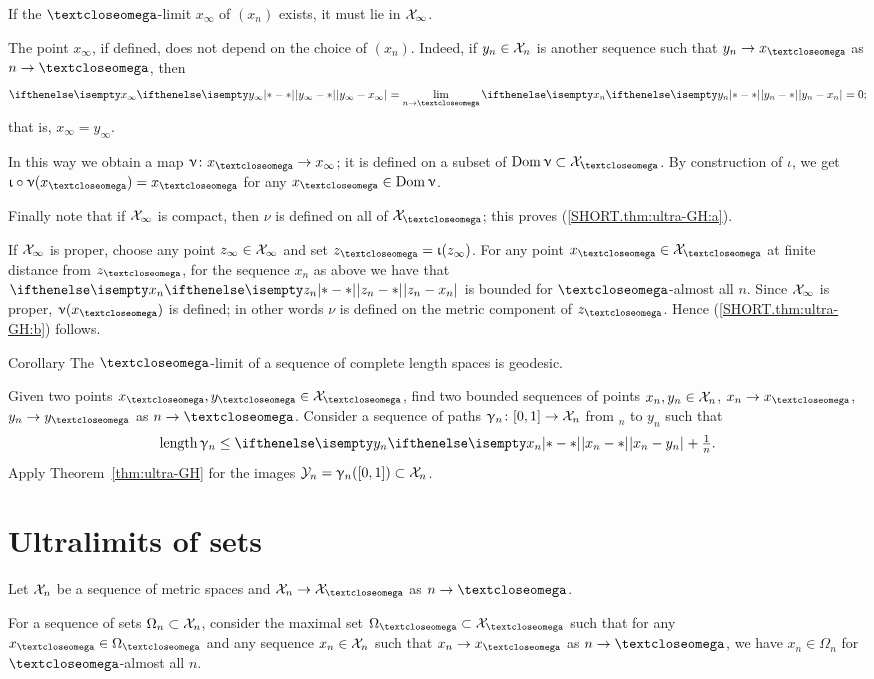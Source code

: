 If the $\o$-limit $x_\infty$ of $(x_n)$ exists, 
it must lie in $\mathcal{X}_\infty$. 

The point $x_\infty$, if defined, does not depend on the choice of $(x_n)$.
Indeed, if $y_n\in\spc{X}_n$ is another sequence such that $y_n\to x_\o$ as $n\to\o$, then 
\[
\dist{y_\infty}{x_\infty}{}=\lim_{n\to\o}\dist{y_n}{x_n}{}=0;
\]
that is, $x_\infty=y_\infty$.


In this way we obtain a map $\nu\:x_\o\to x_\infty$;
it is defined on a subset of $\Dom\nu \subset\spc{X}_\o$.
By construction of $\iota$, 
we get  $\iota\circ\nu(x_\o)=x_\o$ for any $x_\o\in \Dom\nu$.

Finally note that if $\mathcal{X}_\infty$ is compact, then $\nu$ is defined on all of $\spc{X}_\o$;
this proves (\ref{SHORT.thm:ultra-GH:a}).

If $\mathcal{X}_\infty$ is proper, choose any point $z_\infty\in \spc{X}_\infty$
and set $z_\o=\iota(z_\infty)$.
For any point $x_\o\in \spc{X}_\o$ at finite distance from $z_\o$,
for the sequence $x_n$ 
as above we have that $\dist{z_n}{x_n}{}$ is bounded for $\o$-almost all $n$.
Since $\mathcal{X}_\infty$ is proper, $\nu(x_\o)$ is defined;
in other words $\nu$ is defined on the metric component of $z_\o$.
Hence (\ref{SHORT.thm:ultra-GH:b}) follows.
\qeds

\begin{thm}{Corollary} 
\label{cor:ulara-geod}
The $\o$-limit of a sequence of complete length spaces is geodesic.
\end{thm}

 Given two points $x_\o,y_\o\in \spc{X}_\o$, find two bounded sequences of points $x_n,y_n\in \spc{X}_n$, $x_n\to x_\o$, $y_n\to y_\o$ as $n\to\o$.
Consider a sequence of paths  $\gamma_n\:[0,1]\to \spc{X}_n$ from $_n$ to $y_n$
 such that 
\[\length\gamma_n\le \dist{x_n}{y_n}{}+\tfrac{1}{n}.\]
Apply Theorem~\ref{thm:ultra-GH} 
for the images $\spc{Y}_n=\gamma_n([0,1])\subset \spc{X}_n$.
\qeds

\section{Ultralimits of sets}

Let $\mathcal{X}_n$ be a sequence of metric spaces and $\spc{X}_n\to \spc{X}_\o$
as $n\to \o$.

For a sequence of sets $\Omega_n\subset \spc{X}_n$,
consider the maximal set $\Omega_\o\subset \spc{X}_\o$ such that 
for any $x_\o\in\Omega_\o$ and any sequence $x_n\in\spc{X}_n$ such that $x_n\to x_\o$ as $n\to \o$, we have $x_n\in\Omega_n$ for $\o$-almost all $n$.

